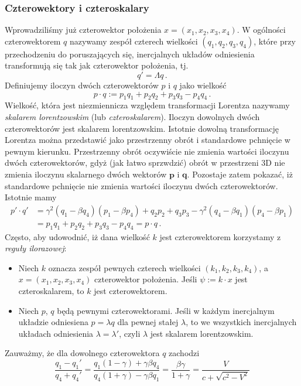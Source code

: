 \documentclass[../main.tex]{subfiles}
\begin{document}
\subsubsection{Czterowektory i czteroskalary}
Wprowadziliśmy już czterowektor położenia \(x=(x_1,x_2,x_3,x_4)\). W ogólności czterowektorem \(q\) nazywamy zespół czterech wielkości \((q_1,q_2,q_3,q_4)\), które przy przechodzeniu do poruszających się, inercjalnych układów odniesienia transformują się tak jak czterowektor położenia, tj.
\begin{equation*}
    q'=\Lambda q\,.
\end{equation*}
Definiujemy iloczyn dwóch czterowektorów \(p\) i \(q\) jako wielkość
\begin{equation*}
    p\cdot q:=p_1q_1+p_2q_2+p_3q_3-p_4q_4\,.
\end{equation*}
Wielkość, która jest niezmiennicza względem transformacji Lorentza nazywamy \textit{skalarem lorentzowskim} (lub \textit{czteroskalarem}). Iloczyn dowolnych dwóch czterowektorów jest skalarem lorentzowskim. Istotnie dowolną transformację Lorentza można przedstawić jako przestrzenny obrót i standardowe pchnięcie w pewnym kierunku. Przestrzenny obrót oczywiście nie zmienia wartości iloczynu dwóch czterowektorów, gdyż (jak łatwo sprzwdzić) obrót w przestrzeni 3D nie zmienia iloczynu skalarnego dwóch wektorów \(\mathbf{p}\) i \(\mathbf{q}\). Pozostaje zatem pokazać, iż standardowe pchnięcie nie zmienia wartości iloczynu dwóch czterowektorów. Istotnie mamy
\begin{equation*}
\begin{split}
    p'\cdot q'&=\gamma^2(q_1-\beta q_4)(p_1-\beta p_4)+q_2p_2+q_3p_3-\gamma^2(q_4-\beta q_1)(p_4-\beta p_1)\\
    &=p_1q_1+p_2q_2+p_3q_3-p_4q_4=p\cdot q\,.
\end{split}
\end{equation*}
Często, aby udowodnić, iż dana wielkość \(k\) jest czterowektorem korzystamy z \textit{reguły ilorazowej}:\\
\begin{itemize}
    \item Niech \(k\) oznacza zespół pewnych czterech wielkości \((k_1,k_2,k_3,k_4)\), a \(x=(x_1,x_2,x_3,x_4)\) czterowektor położenia. Jeśli \(\psi:=k\cdot x\) jest czteroskalarem, to \(k\) jest czterowektorem.
    \item Niech \(p\), \(q\) będą pewnymi czterowektorami. Jeśli w każdym inercjalnym układzie odniesiena \(p=\lambda q\) dla pewnej stałej \(\lambda\), to we wszystkich inercjalnych układach odniesienia \(\lambda=\lambda'\), czyli \(\lambda\) jest skalarem lorentzowskim.
\end{itemize}
Zauważmy, że dla dowolnego czterowektora \(q\) zachodzi
\begin{equation*}
    \frac{q_1-q_1'}{q_4+q_4'}=\frac{q_1(1-\gamma)+\gamma\beta q_4}{q_4(1+\gamma)-\gamma\beta q_1}=\frac{\beta\gamma}{1+\gamma}=\frac{V}{c+\sqrt{c^2-V^2}}
\end{equation*}
\end{document}
